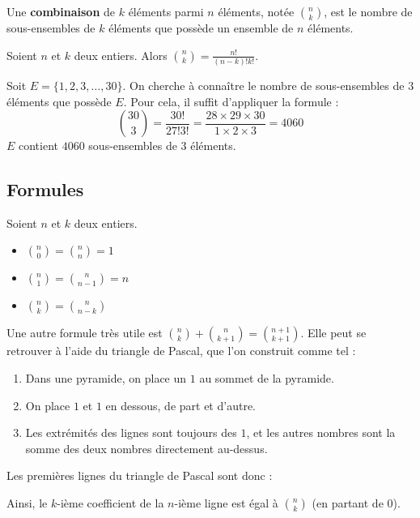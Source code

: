 	\begin{formula}[Définition]
		Une \textbf{combinaison} de $k$ éléments parmi $n$ éléments, notée $\binom{n}{k}$, est le nombre de sous-ensembles de $k$ éléments que possède un ensemble de $n$ éléments.
	\end{formula}

	\begin{formula}
		Soient $n$ et $k$ deux entiers. Alors $\binom{n}{k} = \frac{n!}{(n-k)!k!}$.
	\end{formula}

	\begin{tip}[Exemple]
		Soit $E = \{1, 2, 3, \dots, 30 \}$. On cherche à connaître le nombre de sous-ensembles de $3$ éléments que possède $E$. Pour cela, il suffit d'appliquer la formule :
		\[ \binom{30}{3} = \frac{30!}{27!3!} = \frac{28 \times 29 \times 30}{1 \times 2 \times 3} = 4060 \]
		$E$ contient $4060$ sous-ensembles de $3$ éléments.
	\end{tip}

	\subsection{Formules}

	\begin{formula}[Formules]
		Soient $n$ et $k$ deux entiers.
		\begin{itemize}
			\item $\binom{n}{0} = \binom{n}{n} = 1$
			\item $\binom{n}{1} = \binom{n}{n-1} = n$
			\item $\binom{n}{k} = \binom{n}{n-k}$
		\end{itemize}
	\end{formula}

	\begin{tip}
		Une autre formule très utile est $\binom{n}{k} + \binom{n}{k+1} = \binom{n+1}{k+1}$. Elle peut se retrouver à l'aide du triangle de Pascal, que l'on construit comme tel :
		\begin{enumerate}
			\item Dans une pyramide, on place un $1$ au sommet de la pyramide.
			\item On place $1$ et $1$ en dessous, de part et d'autre.
			\item Les extrémités des lignes sont toujours des $1$, et les autres nombres sont la somme des deux nombres directement au-dessus.
		\end{enumerate}
		Les premières lignes du triangle de Pascal sont donc :

		Ainsi, le $k$-ième coefficient de la $n$-ième ligne est égal à $\binom{n}{k}$ (en partant de $0$).
	\end{tip}

